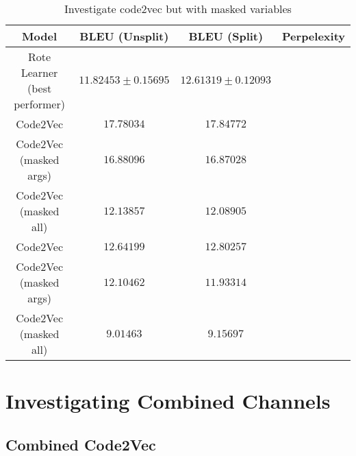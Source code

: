 \begin{table}[ht!]
\begin{center}
\begin{tabular}{ c | c | c | c }
    Model                             & BLEU (Unsplit)  & BLEU (Split)    & Perpelexity \\
    \hline
    Rote Learner (best performer)          & $ 11.82453 \pm  0.15695 $ & $ 12.61319 \pm 0.12093 $ & \\
    \hline
    Code2Vec                              & $ 17.78034 $ & $ 17.84772 $ & \\
    Code2Vec (masked args)                & $ 16.88096 $ & $ 16.87028 $ & \\
    Code2Vec (masked all)                 & $ 12.13857 $ & $ 12.08905 $ & \\
    \hdashline

    Code2Vec                              & $ 12.64199 $ & $ 12.80257 $ & \\
    Code2Vec (masked args)                & $ 12.10462 $ & $ 11.93314 $ & \\
    Code2Vec (masked all)                 & $ 9.01463 $ & $ 9.15697 $ & \\
    \hline
\end{tabular}
\caption {Investigate code2vec but with masked variables}
\label{table:code_2_vec_masked}
\end{center}
\end{table}


\section{Investigating Combined Channels} %
\label{sec:investigating_combined_channels}

\subsection{Combined Code2Vec } %
\label{sub:combined_code2vec}


